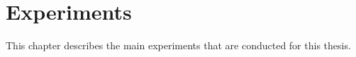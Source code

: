 \chapter{Experiments}\label{ch:experiments}

This chapter describes the main experiments that are conducted for this thesis.
